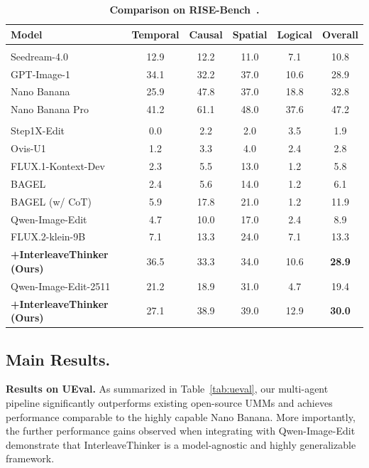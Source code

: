 \documentclass{article} %
\begin{document}
\begin{table}[t]
\small 
  \caption{\textbf{Comparison on RISE-Bench~\cite{rise}.}}
  \label{tab:rise}
  \centering
{
\setlength{\tabcolsep}{7pt}  
  \begin{tabular}{l ccccc}
    \toprule[0.1em]
    \textbf{Model} & \textbf{Temporal} & \textbf{Causal} & \textbf{Spatial} & \textbf{Logical} & \textbf{Overall} \\
    \midrule[0.1em]
    \rowcolor{gray!10}
    \multicolumn{6}{c}{\textbf{\textit{Proprietary Models}}} \\
    \midrule[0.1em]
    Seedream-4.0~\cite{seedream4} & 12.9 & 12.2 & 11.0 & 7.1 & 10.8 \\
    GPT-Image-1~\cite{gptimage} & 34.1 & 32.2 & 37.0 & 10.6 & 28.9 \\
    Nano Banana~\cite{nanobanana} & 25.9 & 47.8 & 37.0 & 18.8 & 32.8 \\
    Nano Banana Pro~\cite{nanopro} & 41.2 & 61.1 & 48.0 & 37.6 & 47.2 \\
    \midrule[0.1em]
    \rowcolor{gray!10}
    \multicolumn{6}{c}{\textbf{\textit{Open-source Models}}} \\
    \midrule[0.1em]
    Step1X-Edit~\cite{step1x} & 0.0 & 2.2 & 2.0 & 3.5 & 1.9 \\
    Ovis-U1~\cite{wang2025ovis} & 1.2 & 3.3 & 4.0 & 2.4 & 2.8 \\
    FLUX.1-Kontext-Dev~\cite{flux-kontext} & 2.3 & 5.5 & 13.0 & 1.2 & 5.8 \\
    BAGEL~\cite{bagel} & 2.4 & 5.6 & 14.0 & 1.2 & 6.1 \\
    BAGEL (w/ CoT)~\cite{bagel}  & 5.9 & 17.8 & 21.0 & 1.2 & 11.9 \\
    Qwen-Image-Edit~\cite{qwenimage} & 4.7 & 10.0 & 17.0 & 2.4 & 8.9 \\
    \midrule[0.1em]
    FLUX.2-klein-9B~\cite{flux2}  & 7.1 & 13.3 & 24.0 & 7.1 & 13.3 \\
    \quad\textbf{+InterleaveThinker (Ours)} & 36.5 & 33.3 & 34.0 & 10.6 & \textbf{28.9}\\
    Qwen-Image-Edit-2511~\cite{qwenimage} & 21.2	& 18.9 & 31.0 & 4.7 & 19.4\\
    \quad\textbf{+InterleaveThinker (Ours)} & 27.1 & 38.9 & 39.0 & 12.9 & \textbf{30.0} \\
    \bottomrule[0.1em]
  \end{tabular}
  }
  \vspace{-2mm}
\end{table}

\subsection{Main Results.}
\vspace{-1mm}
\textbf{Results on UEval.} As summarized in Table~\ref{tab:ueval}, our multi-agent pipeline significantly outperforms existing open-source UMMs and achieves performance comparable to the highly capable Nano Banana. More importantly, the further performance gains observed when integrating with Qwen-Image-Edit demonstrate that InterleaveThinker is a model-agnostic and highly generalizable framework.
\end{document}
